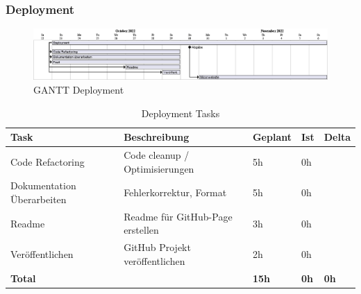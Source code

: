   \subsubsection{Deployment}
  \begin{figure}[H]
    \begin{center}
      \includegraphics[width=1\linewidth]{../content/diagrams/gantt/deploymentPlanning/deploymentPlanning.png}
      \caption{GANTT Deployment }
    \end{center}
  \end{figure}
  \begin{table}[H]
    \centering
    \settowidth{}
    \setlength\extrarowheight{2pt}
    \begin{tabulary}{1.0\textwidth}{|L|L|L|L|L|}
      \hline
      \textbf{Task} &
      \textbf{Beschreibung} &
      \textbf{Geplant}&
      \textbf{Ist}&
      \textbf{Delta}\\
      \hline
      Code Refactoring &
      Code cleanup / Optimisierungen &
      5h &
      0h &
      \\
      \hline
      Dokumentation Überarbeiten &
      Fehlerkorrektur, Format &
      5h &
      0h &
      \\
      \hline
      Readme&
      Readme für GitHub-Page erstellen&
      3h &
      0h &
      \\
      \hline
      Veröffentlichen &
      GitHub Projekt veröffentlichen &
      2h &
      0h &
      \\
      \hline
      \textbf{Total} &
       &
      \textbf{15h} &
      \textbf{0h} &
      \textbf{0h} \\
      \hline
    \end{tabulary}
    \caption{Deployment Tasks}
  \end{table}



